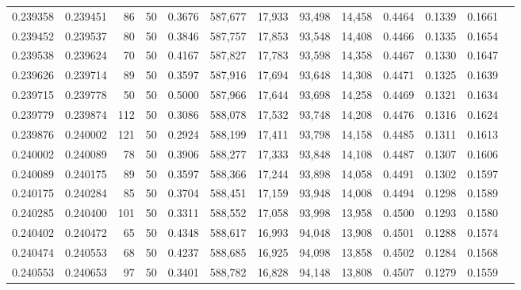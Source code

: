 \begin{tabular}{rrrrrrrrrrrrr}
0.239358 & 0.239451 &    86 &  50 &                                     0.3676 & 587,677 &  17,933 &  93,498 &  14,458 & 0.4464 & 0.1339 & 0.1661 \\
0.239452 & 0.239537 &    80 &  50 &                                     0.3846 & 587,757 &  17,853 &  93,548 &  14,408 & 0.4466 & 0.1335 & 0.1654 \\
0.239538 & 0.239624 &    70 &  50 &                                     0.4167 & 587,827 &  17,783 &  93,598 &  14,358 & 0.4467 & 0.1330 & 0.1647 \\
0.239626 & 0.239714 &    89 &  50 &                                     0.3597 & 587,916 &  17,694 &  93,648 &  14,308 & 0.4471 & 0.1325 & 0.1639 \\
0.239715 & 0.239778 &    50 &  50 &                                     0.5000 & 587,966 &  17,644 &  93,698 &  14,258 & 0.4469 & 0.1321 & 0.1634 \\
0.239779 & 0.239874 &   112 &  50 &                                     0.3086 & 588,078 &  17,532 &  93,748 &  14,208 & 0.4476 & 0.1316 & 0.1624 \\
0.239876 & 0.240002 &   121 &  50 &                                     0.2924 & 588,199 &  17,411 &  93,798 &  14,158 & 0.4485 & 0.1311 & 0.1613 \\
0.240002 & 0.240089 &    78 &  50 &                                     0.3906 & 588,277 &  17,333 &  93,848 &  14,108 & 0.4487 & 0.1307 & 0.1606 \\
0.240089 & 0.240175 &    89 &  50 &                                     0.3597 & 588,366 &  17,244 &  93,898 &  14,058 & 0.4491 & 0.1302 & 0.1597 \\
0.240175 & 0.240284 &    85 &  50 &                                     0.3704 & 588,451 &  17,159 &  93,948 &  14,008 & 0.4494 & 0.1298 & 0.1589 \\
0.240285 & 0.240400 &   101 &  50 &                                     0.3311 & 588,552 &  17,058 &  93,998 &  13,958 & 0.4500 & 0.1293 & 0.1580 \\
0.240402 & 0.240472 &    65 &  50 &                                     0.4348 & 588,617 &  16,993 &  94,048 &  13,908 & 0.4501 & 0.1288 & 0.1574 \\
0.240474 & 0.240553 &    68 &  50 &                                     0.4237 & 588,685 &  16,925 &  94,098 &  13,858 & 0.4502 & 0.1284 & 0.1568 \\
0.240553 & 0.240653 &    97 &  50 &                                     0.3401 & 588,782 &  16,828 &  94,148 &  13,808 & 0.4507 & 0.1279 & 0.1559 \\

\end{tabular}
